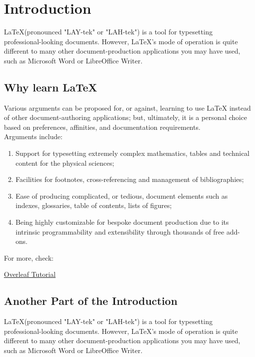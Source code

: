 \chapter{Introduction\label{chap:1}}
\noindent \LaTeX (pronounced "LAY-tek" or "LAH-tek") is a tool for typesetting professional-looking documents. However, LaTeX's mode of operation is quite different to many other document-production applications you may have used, such as Microsoft Word or LibreOffice Writer.

\section{Why learn \LaTeX}

\noindent Various arguments can be proposed for, or against, learning to use LaTeX instead of other document-authoring applications; but, ultimately, it is a personal choice based on preferences, affinities, and documentation requirements. \\

Arguments include:
\begin{enumerate}
\item[1.] Support for typesetting extremely complex mathematics, tables and technical content for the physical sciences;
\item[2.] Facilities for footnotes, cross-referencing and management of bibliographies;
\item[3.] Ease of producing complicated, or tedious, document elements such as indexes, glossaries, table of contents, lists of figures;
\item[4.] Being highly customizable for bespoke document production due to its intrinsic programmability and extensibility through thousands of free add-ons.
\end{enumerate}

\noindent For more, check:

\href{https://www.overleaf.com/learn/latex/Learn_LaTeX_in_30_minutes#What_is_LaTeX?}{Overleaf Tutorial}




\section{Another Part of the Introduction}

\noindent \LaTeX (pronounced "LAY-tek" or "LAH-tek") is a tool for typesetting professional-looking documents. However, LaTeX's mode of operation is quite different to many other document-production applications you may have used, such as Microsoft Word or LibreOffice Writer.\\

